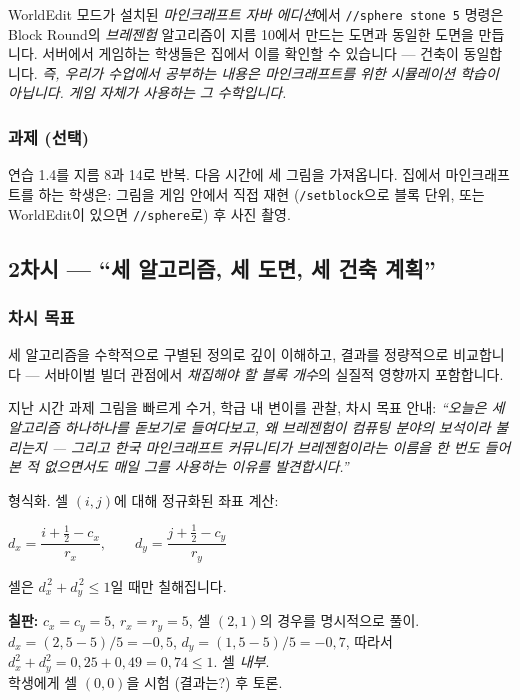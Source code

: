 \documentclass[12pt,a4paper]{scrartcl}
\newcommand{\cmd}[1]{\textcolor{earth}{\texttt{\small #1}}}
\newcommand{\tempo}[1]{\textnormal{\footnotesize\color{bg!90!white}\textsf{#1}}}
\begin{document}
\begin{minecraft}[게임과의 연결]
WorldEdit 모드가 설치된 \emph{마인크래프트 자바 에디션}에서 \cmd{//sphere stone 5} 명령은 Block Round의 \emph{브레젠험} 알고리즘이 지름 10에서 만드는 도면과 동일한 도면을 만듭니다. 서버에서 게임하는 학생들은 집에서 이를 확인할 수 있습니다 --- 건축이 동일합니다. \emph{즉, 우리가 수업에서 공부하는 내용은 마인크래프트를 위한 시뮬레이션 학습이 아닙니다. 게임 자체가 사용하는 그 수학입니다.}
\end{minecraft}

\subsubsection*{과제 (선택)}
연습 1.4를 지름 8과 14로 반복. 다음 시간에 세 그림을 가져옵니다. 집에서 마인크래프트를 하는 학생은: 그림을 게임 안에서 직접 재현 (\cmd{/setblock}으로 블록 단위, 또는 WorldEdit이 있으면 \cmd{//sphere}로) 후 사진 촬영.

\subsection{2차시 --- \enquote{세 알고리즘, 세 도면, 세 건축 계획}}\label{aula2}

\subsubsection*{차시 목표}
세 알고리즘을 수학적으로 구별된 정의로 깊이 이해하고, 결과를 정량적으로 비교합니다 --- 서바이벌 빌더 관점에서 \emph{채집해야 할 블록 개수}의 실질적 영향까지 포함합니다.

\begin{hwaldong}[2.1 --- 회고 \quad\tempo{5분}]
지난 시간 과제 그림을 빠르게 수거, 학급 내 변이를 관찰, 차시 목표 안내: \emph{\enquote{오늘은 세 알고리즘 하나하나를 돋보기로 들여다보고, 왜 브레젠험이 컴퓨팅 분야의 보석이라 불리는지 --- 그리고 한국 마인크래프트 커뮤니티가 브레젠험이라는 이름을 한 번도 들어본 적 없으면서도 매일 그를 사용하는 이유를 발견합시다.}}
\end{hwaldong}

\begin{hwaldong}[2.2 --- 유클리드 알고리즘 \quad\tempo{10분}]
형식화. 셀 $(i, j)$에 대해 정규화된 좌표 계산:

\begin{susik}
\centering
$\displaystyle d_x = \dfrac{i + \tfrac{1}{2} - c_x}{r_x},\qquad d_y = \dfrac{j + \tfrac{1}{2} - c_y}{r_y}$
\end{susik}

셀은 $d_x^{\,2} + d_y^{\,2} \leq 1$일 때만 칠해집니다.

\textbf{칠판:} $c_x = c_y = 5$, $r_x = r_y = 5$, 셀 $(2, 1)$의 경우를 명시적으로 풀이. $d_x = (2{,}5 - 5)/5 = -0{,}5$, $d_y = (1{,}5 - 5)/5 = -0{,}7$, 따라서 $d_x^2 + d_y^2 = 0{,}25 + 0{,}49 = 0{,}74 \leq 1$. 셀 \emph{내부}. \\

학생에게 셀 $(0, 0)$을 시험 (결과는?) 후 토론.
\end{hwaldong}
\end{document}
